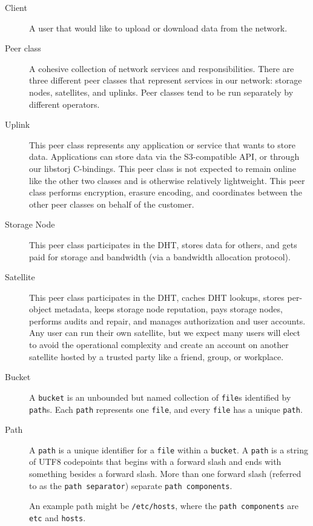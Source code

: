 \documentclass[a4paper,10pt]{article} \usepackage[utf8]{inputenc}
\newcommand{\x}[1]{{\tt #1}} \newcommand{\code}[1]{{\tt #1}}
\begin{document}
\begin{description}
\item[Client] A user that would like to upload or download data from the network.

\item[Peer class] A cohesive collection of network services and
  responsibilities. There are three different peer classes that represent
  services in our network: storage nodes, satellites, and uplinks. Peer classes
  tend to be run separately by different operators.

\item[Uplink] This peer class represents any application or
  service that wants to store data. Applications can store data via the
  S3-compatible API, or through our libstorj C-bindings. This peer class
  is not expected to remain online like the other two classes and is otherwise
  relatively lightweight. This peer class performs encryption, erasure encoding,
  and coordinates between the other peer classes on behalf of the customer.

\item[Storage Node] This peer class participates in the DHT, stores data for
  others, and gets paid for storage and bandwidth (via a bandwidth allocation
  protocol).

\item[Satellite] This peer class participates in the DHT, caches
  DHT lookups, stores per-object metadata, keeps storage node reputation, pays
  storage nodes, performs audits and repair, and manages authorization and user
  accounts. Any user can run their own satellite, but we expect many users
  will elect to avoid the operational complexity and create an account on
  another satellite hosted by a trusted party like a friend, group, or
  workplace.

\item[Bucket] A \x{bucket} is an unbounded but named
collection of \x{file}s identified by \x{path}s. Each \x{path} represents one
\x{file}, and every \x{file} has a unique \x{path}.

\item[Path] A \x{path} is a unique identifier for a \x{file} within a
\x{bucket}. A \x{path} is a string of UTF8 codepoints that begins with a forward
slash and ends with something besides a forward slash. More than one forward
slash (referred to as the \x{path separator}) separate \x{path components}.

An example path might be \code{/etc/hosts}, where the \x{path components} are
\code{etc} and \code{hosts}.


\end{description}
\end{document}
